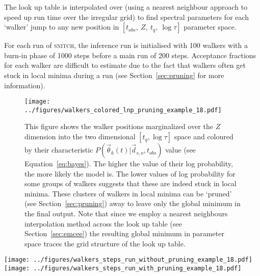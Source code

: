 \documentclass[useAMS,usenatbib]{mn2e}
\begin{document}
 
The look up table is interpolated over (using a nearest neighbour approach to speed up run time over the irregular grid) to find spectral parameters for each `walker' jump to any new position in $[t_{obs},~Z,~t_q,~\log\tau]$ parameter space. 

For each run of \textsc{snitch}, the inference run is initialised with 100 walkers with a burn-in phase of 1000 steps before a main run of 200 steps. Acceptance fractions for each walker are difficult to estimate due to the fact that walkers often get stuck in local minima during a run (see Section~\ref{sec:pruning} for more information). 

\begin{figure}
\centering
\texttt{[image: ../figures/walkers\_colored\_lnp\_pruning\_example\_18.pdf]}
\caption{This figure shows the walker positions marginalized over the $Z$ dimension into the two dimensional $[t_q, \log\tau]$ space and coloured by their characteristic $P(\vec{\theta}_k (t)|\vec{d}_{s,o}, t_{obs})$ value (see Equation~\ref{eq:bayes}). The higher the value of their log probability, the more likely the model is. The lower values of log probability for some groups of walkers suggests that these are indeed stuck in local minima. These clusters of walkers in local minima can be `pruned' (see Section~\ref{sec:pruning}) away to leave only the global minimum in the final output. Note that since we employ a nearest neighbours interpolation method across the look up table (see Section~\ref{sec:emcee}) the resulting global minimum in parameter space traces the grid structure of the look up table.}
\label{fig:localminima}
\end{figure}


\begin{figure*}
\centering
\texttt{[image: ../figures/walkers\_steps\_run\_without\_pruning\_example\_18.pdf]}
\texttt{[image: ../figures/walkers\_steps\_run\_with\_pruning\_example\_18.pdf]}
\caption{The positions traced by the \emph{emcee} walkers with step number (i.e. time) in each of the $[Z, t_q, \log \tau]$ dimensions in the post burn-in phase before pruning (left) and after pruning (right). Walkers have got stuck in local minima (see also Figure~\ref{fig:localminima}) but some have managed to find the global minimum. The right panel therefore shows how the walkers left after pruning have fully explored the global minimum around the known true values (shown in red in each panel).}
\label{fig:comparepruning}
\end{figure*}
\end{document}
